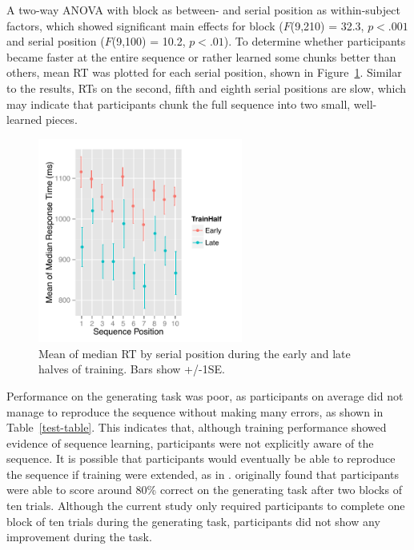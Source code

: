\documentclass[man,floatsintext]{apa6}
\begin{document}
A two-way ANOVA with block as between- and serial position as within-subject factors, which showed significant main effects for block ($F$(9,210) = 32.3, $p<.001$ and serial position ($F$(9,100) = 10.2, $p<.01$). To determine whether participants became faster at the entire sequence or rather learned some chunks better than others, mean RT was plotted for each serial position, shown in Figure~\ref{fig:Seqpos}. Similar to the  results, RTs on the second, fifth and eighth serial positions are slow, which may indicate that participants chunk the full sequence into two small, well-learned pieces.

\begin{figure}[!h]
  \centering
  \includegraphics[width=0.6\textwidth]{figures/exp1_RT_by_sequence_position}
  \caption{Mean of median RT by serial position during the early and late halves of training. Bars show +/-1SE.}
  \label{fig:Seqpos}
\end{figure} 

Performance on the generating task was poor, as participants on average did not manage to reproduce the sequence without making many errors, as shown in Table~\ref{test-table}. This indicates that, although training performance showed evidence of sequence learning, participants were not explicitly aware of the sequence. It is possible that participants would eventually be able to reproduce the sequence if training were extended, as in .  originally found that participants were able to score around 80\% correct on the generating task after two blocks of ten trials. Although the current study only required participants to complete one block of ten trials during the generating task, participants did not show any improvement during the task. 
\end{document}
